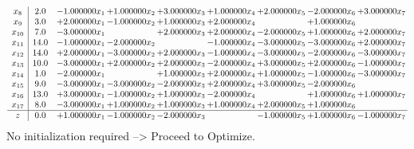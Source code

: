 \documentclass[10pt]{article}
\begin{document}
\[\begin{array}{c| c c@{\hskip 2pt} c@{\hskip 2pt} c@{\hskip 2pt} c@{\hskip 2pt} c@{\hskip 2pt} c@{\hskip 2pt} c@{\hskip 2pt} }
 x_{8}   &  2.0 & -1.000000 x_{1} & + 1.000000 x_{2} & + 3.000000 x_{3} & + 1.000000 x_{4} & + 2.000000 x_{5} & -2.000000 x_{6} & + 3.000000 x_{7}\\
 x_{9}   &  3.0 & + 2.000000 x_{1} & -1.000000 x_{2} & + 1.000000 x_{3} & + 2.000000 x_{4} &   & + 1.000000 x_{6} &   \\
 x_{10}   &  7.0 & -3.000000 x_{1} &   & + 2.000000 x_{3} & + 2.000000 x_{4} & -2.000000 x_{5} & + 1.000000 x_{6} & + 2.000000 x_{7}\\
 x_{11}   &  14.0 & -1.000000 x_{1} & -2.000000 x_{2} &   & -1.000000 x_{4} & -3.000000 x_{5} & -3.000000 x_{6} & + 2.000000 x_{7}\\
 x_{12}   &  14.0 & + 2.000000 x_{1} & -3.000000 x_{2} & + 2.000000 x_{3} & -1.000000 x_{4} & -3.000000 x_{5} & -2.000000 x_{6} & -3.000000 x_{7}\\
 x_{13}   &  10.0 & -3.000000 x_{1} & + 2.000000 x_{2} & + 2.000000 x_{3} & -2.000000 x_{4} & + 3.000000 x_{5} & + 2.000000 x_{6} & -1.000000 x_{7}\\
 x_{14}   &  1.0 & -2.000000 x_{1} &   & + 1.000000 x_{3} & + 2.000000 x_{4} & + 1.000000 x_{5} & -1.000000 x_{6} & -3.000000 x_{7}\\
 x_{15}   &  9.0 & -3.000000 x_{1} & -3.000000 x_{2} & -2.000000 x_{3} & + 2.000000 x_{4} & + 3.000000 x_{5} & -2.000000 x_{6} &   \\
 x_{16}   &  13.0 & + 3.000000 x_{1} & -1.000000 x_{2} & + 1.000000 x_{3} & -2.000000 x_{4} &   & + 1.000000 x_{6} & + 1.000000 x_{7}\\
 x_{17}   &  8.0 & -3.000000 x_{1} & + 1.000000 x_{2} & + 1.000000 x_{3} & + 1.000000 x_{4} & + 2.000000 x_{5} & + 1.000000 x_{6} &   \\
\hline
z    &  0.0 & + 1.000000 x_{1} & -1.000000 x_{2} & -2.000000 x_{3} &   & -1.000000 x_{5} & + 1.000000 x_{6} & -1.000000 x_{7}\\
\end{array}\]
No initialization required --> Proceed to Optimize. 
\end{document}
